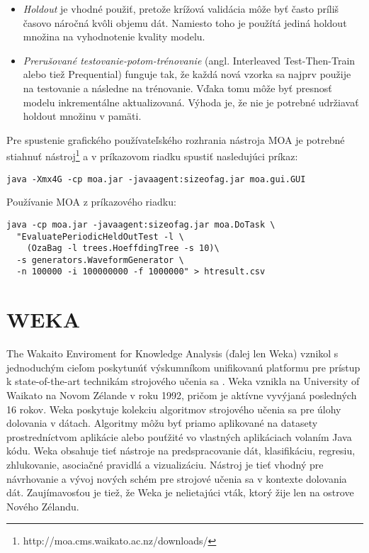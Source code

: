 \begin{itemize}
	\item \textit{Holdout} je vhodné použiť, pretože krížová validácia môže byť často príliš časovo náročná kvôli objemu dát. Namiesto toho je použítá jediná holdout množina na vyhodnotenie kvality modelu.
	\item \textit{Prerušované testovanie-potom-trénovanie} (angl. Interleaved Test-Then-Train alebo tiež Prequential) funguje tak, že každá nová vzorka sa najprv použije na testovanie a následne na trénovanie. Vďaka tomu môže byť presnosť modelu inkrementálne aktualizovaná. Výhoda je, že nie je potrebné udržiavať holdout množinu v pamäti. 
\end{itemize}
\par
Pre spustenie grafického používateľského rozhrania nástroja MOA je potrebné stiahnuť nástroj\footnote{http://moa.cms.waikato.ac.nz/downloads/} a v príkazovom riadku spustiť nasledujúci príkaz:
\begin{lstlisting}
java -Xmx4G -cp moa.jar -javaagent:sizeofag.jar moa.gui.GUI
\end{lstlisting}
Používanie MOA z príkazového riadku:
\begin{lstlisting}
java -cp moa.jar -javaagent:sizeofag.jar moa.DoTask \
  "EvaluatePeriodicHeldOutTest -l \
	(OzaBag -l trees.HoeffdingTree -s 10)\
  -s generators.WaveformGenerator \
  -n 100000 -i 100000000 -f 1000000" > htresult.csv
\end{lstlisting}



\section{WEKA}
The Wakaito Enviroment for Knowledge Analysis (ďalej len Weka) vznikol s jednoduchým cieľom poskytunúť výskumníkom unifikovanú platformu pre prístup k state-of-the-art technikám strojového učenia sa \citep{hall2009weka}. Weka vznikla na University of Waikato na Novom Zélande v roku 1992, pričom je aktívne vyvýjaná posledných 16 rokov. Weka poskytuje kolekciu algoritmov strojového učenia sa pre úlohy dolovania v dátach. Algoritmy môžu byť priamo aplikované na datasety prostredníctvom aplikácie alebo pouťžité vo vlastných aplikáciach volaním Java kódu. Weka obsahuje tieť nástroje na predspracovanie dát, klasifikáciu, regresiu, zhlukovanie, asociačné pravidlá a vizualizáciu. Nástroj je tieť vhodný pre návrhovanie a vývoj nových schém pre strojové učenia sa v kontexte dolovania dát. Zaujímavosťou je tiež, že Weka je nelietajúci vták, ktorý žije len na ostrove Nového Zélandu. \\

